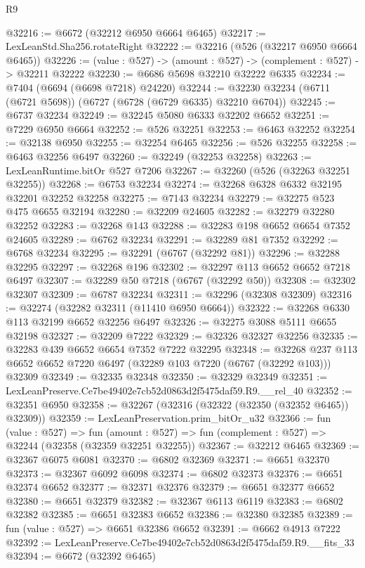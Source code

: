 \begin{lexlean}{R9}
\begin{coremodule}
@32216 := @6672 (@32212 @6950 @6664 @6465)
@32217 := LexLeanStd.Sha256.rotateRight
@32222 := @32216 (@526 (@32217 @6950 @6664 @6465))
@32226 := (value : @527) -> (amount : @527) -> (complement : @527) -> @32211 @32222
@32230 := @6686 @5698 @32210 @32222 @6335
@32234 := @7404 (@6694 (@6698 @7218) @24220)
@32244 := @32230 @32234 (@6711 (@6721 @5698)) (@6727 (@6728 (@6729 @6335) @32210 @6704))
@32245 := @6737 @32234
@32249 := @32245 @5080 @6333 @32202 @6652
@32251 := @7229 @6950 @6664
@32252 := @526 @32251
@32253 := @6463 @32252
@32254 := @32138 @6950
@32255 := @32254 @6465
@32256 := @526 @32255
@32258 := @6463 @32256 @6497
@32260 := @32249 (@32253 @32258)
@32263 := LexLeanRuntime.bitOr @527 @7206
@32267 := @32260 (@526 (@32263 @32251 @32255))
@32268 := @6753 @32234
@32274 := @32268 @6328 @6332 @32195 @32201 @32252 @32258
@32275 := @7143 @32234
@32279 := @32275 @523 @475 @6655 @32194
@32280 := @32209 @24605
@32282 := @32279 @32280 @32252
@32283 := @32268 @143
@32288 := @32283 @198 @6652 @6654 @7352 @24605
@32289 := @6762 @32234
@32291 := @32289 @81 @7352
@32292 := @6768 @32234
@32295 := @32291 (@6767 (@32292 @81))
@32296 := @32288 @32295
@32297 := @32268 @196
@32302 := @32297 @113 @6652 @6652 @7218 @6497
@32307 := @32289 @50 @7218 (@6767 (@32292 @50))
@32308 := @32302 @32307
@32309 := @6787 @32234
@32311 := @32296 (@32308 @32309)
@32316 := @32274 (@32282 @32311 (@11410 @6950 @6664))
@32322 := @32268 @6330 @113 @32199 @6652 @32256 @6497
@32326 := @32275 @3088 @5111 @6655 @32198
@32327 := @32209 @7222
@32329 := @32326 @32327 @32256
@32335 := @32283 @439 @6652 @6654 @7352 @7222 @32295
@32348 := @32268 @237 @113 @6652 @6652 @7220 @6497 (@32289 @103 @7220 (@6767 (@32292 @103))) @32309
@32349 := @32335 @32348
@32350 := @32329 @32349
@32351 := LexLeanPreserve.Ce7be49402e7cb52d0863d2f5475daf59.R9.__rel_40
@32352 := @32351 @6950
@32358 := @32267 (@32316 (@32322 (@32350 (@32352 @6465)) @32309))
@32359 := LexLeanPreservation.prim_bitOr_u32
@32366 := fun (value : @527) =>
  fun (amount : @527) => fun (complement : @527) => @32244 (@32358 (@32359 @32251 @32255))
@32367 := @32212 @6465
@32369 := @32367 @6075 @6081
@32370 := @6802 @32369
@32371 := @6651 @32370
@32373 := @32367 @6092 @6098
@32374 := @6802 @32373
@32376 := @6651 @32374 @6652
@32377 := @32371 @32376
@32379 := @6651 @32377 @6652
@32380 := @6651 @32379
@32382 := @32367 @6113 @6119
@32383 := @6802 @32382
@32385 := @6651 @32383 @6652
@32386 := @32380 @32385
@32389 := fun (value : @527) => @6651 @32386 @6652
@32391 := @6662 @4913 @7222
@32392 := LexLeanPreserve.Ce7be49402e7cb52d0863d2f5475daf59.R9.__fits_33
@32394 := @6672 (@32392 @6465)

\end{coremodule}
\end{lexlean}
